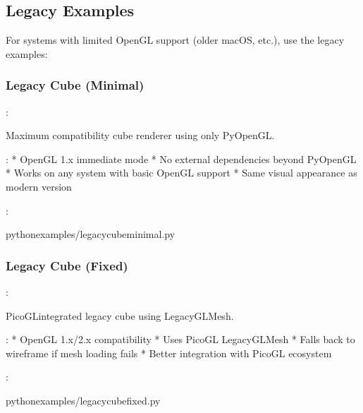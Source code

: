 \documentclass[a4paper,10pt,english,openany,oneside]{sphinxmanual}
\begin{document}
\subsection{Legacy Examples}
\label{\detokenize{examples:legacy-examples}}
\sphinxAtStartPar
For systems with limited OpenGL support (older macOS, etc.), use the legacy examples:


\subsubsection{Legacy Cube (Minimal)}
\label{\detokenize{examples:legacy-cube-minimal}}
\sphinxAtStartPar
{}: 

\sphinxAtStartPar
Maximum compatibility cube renderer using only PyOpenGL.

\sphinxAtStartPar
{}:
* OpenGL 1.x immediate mode
* No external dependencies beyond PyOpenGL
* Works on any system with basic OpenGL support
* Same visual appearance as modern version

\sphinxAtStartPar
{}:

\begin{sphinxVerbatim}[commandchars=\\\{\}]
pythonexamples/legacy\PYGZus{}cube\PYGZus{}minimal.py
\end{sphinxVerbatim}


\subsubsection{Legacy Cube (Fixed)}
\label{\detokenize{examples:legacy-cube-fixed}}
\sphinxAtStartPar
{}: 

\sphinxAtStartPar
PicoGL\sphinxhyphen{}integrated legacy cube using LegacyGLMesh.

\sphinxAtStartPar
{}:
* OpenGL 1.x/2.x compatibility
* Uses PicoGL LegacyGLMesh
* Falls back to wireframe if mesh loading fails
* Better integration with PicoGL ecosystem

\sphinxAtStartPar
{}:

\begin{sphinxVerbatim}[commandchars=\\\{\}]
pythonexamples/legacy\PYGZus{}cube\PYGZus{}fixed.py
\end{sphinxVerbatim}
\end{document}
